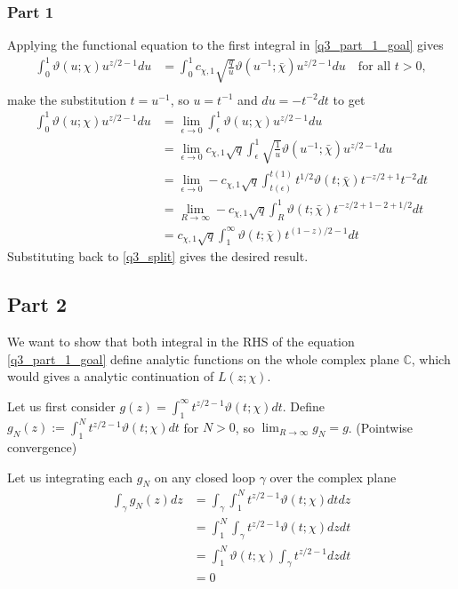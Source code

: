 \documentclass{article}
\theoremstyle{definition}
\theoremstyle{definition}
\theoremstyle{remark}
\begin{document}
\subsubsection*{Part 1}
Applying the functional equation to the first integral in \eqref{q3_part_1_goal} gives
\begin{align}
	\int_0^1 \vartheta(u;\chi) u^{z/2-1} du 
	&= \int_0^1 c_{\chi,1} \sqrt{\frac{q}{u}} \vartheta(u^{-1};\bar{\chi})u^{z/2 - 1} du \quad \text{for all } t > 0, \\ 
\end{align}
make the substitution $t = u^{-1}$, so $u = t^{-1}$ and $du = -t^{-2}dt$ to get 
\begin{align}
	\int_0^1 \vartheta(u;\chi) u^{z/2-1} du 
	& = \lim_{\epsilon \rightarrow 0} \int_{\epsilon}^1 \vartheta(u;\chi) u^{z/2-1} du \\ 
	&= \lim_{\epsilon \rightarrow  0} c_{\chi,1} \sqrt{q} \int_{\epsilon}^{1} 
	\sqrt{\frac{1}{u}} \vartheta(u^{-1};\bar{\chi})u^{z/2 - 1} du
	\\ 
	&= \lim_{\epsilon \rightarrow  0} - c_{\chi,1} \sqrt{q} \int_{t(\epsilon)}^{t(1)} 
	t^{1/2} \vartheta(t;\bar{\chi})t^{-z/2 + 1} t^{-2}  dt
	\\ 
	&= \lim_{R \rightarrow  \infty} - c_{\chi,1} \sqrt{q} \int_{R}^{1} 
	 \vartheta(t;\bar{\chi})t^{-z/2 + 1 -2 + 1/2} dt
	\\ 
	&=  c_{\chi,1} \sqrt{q} \int^{\infty}_{1} 
	 \vartheta(t;\bar{\chi})t^{(1-z)/2 - 1} dt
\end{align}
Substituting back to \eqref{q3_split} gives the desired result.


\subsection*{Part 2}
We want to show that both integral in the RHS of the equation \eqref{q3_part_1_goal} define analytic functions on the whole complex plane $\mathbb{C}$, which would gives a analytic continuation of $L(z;\chi)$.

Let us first consider 
$
g (z) = \int_1^{\infty} t^{z/2-1}\vartheta(t;\chi) dt.
$
Define $g_N (z) := \int_1^{N} t^{z/2-1}\vartheta(t;\chi) dt $ for $N > 0$, so 
$\lim_{R \rightarrow \infty} g_N = g$. (Pointwise convergence)

Let us integrating each $g_N$ on any closed loop $\gamma$ over the complex plane  
\begin{align}
	\int_{\gamma} g_N(z) dz 
	&= \int_{\gamma} \int_1^{N} t^{z/2-1}\vartheta(t;\chi) dt dz 
	\label{q4exchange_integral}
	\\
	&= \int_1^{N} \int_{\gamma}  t^{z/2-1}\vartheta(t;\chi) dz dt 
	\\
	\label{q4holomorphic}
	&= \int_1^{N} \vartheta(t;\chi) \int_{\gamma}  t^{z/2-1} dz dt 
	\\
	&= 0
\end{align}
\end{document}
